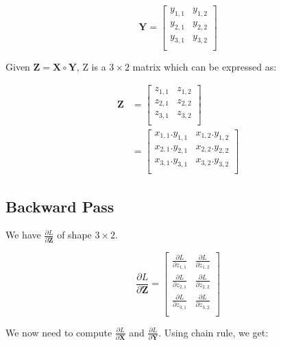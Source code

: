 \documentclass{article}
\newcommand{\matr}[1]{\mathbf{#1}} %
\begin{document}
\begin{displaymath}
\matr{Y} =
\begin{bmatrix}
y_{1,1} & y_{1,2} \\%
y_{2,1} & y_{2,2} \\%
y_{3,1} & y_{3,2} \\%
\end{bmatrix}
\end{displaymath}

Given $\matr{Z} = \matr{X} \circ \matr{Y}$, Z is a $3 \times 2$ matrix which can be expressed as:

\begin{align}
\matr{Z} &= \begin{bmatrix}
z_{1,1} & z_{1,2}\\[0.5em]
z_{2,1} & z_{2,2}\\[0.5em]
z_{3,1} & z_{3,2}\\[0.5em]
\end{bmatrix}
\\
&=
\begin{bmatrix}
x_{1,1}.y_{1,1} & x_{1,2}.y_{1,2} \\[0.5em]
x_{2,1}.y_{2,1} & x_{2,2}.y_{2,2} \\[0.5em]
x_{3,1}.y_{3,1} & x_{3,2}.y_{3,2} \\[0.5em]
\end{bmatrix}
\end{align}

\subsection{Backward Pass}
We have $\frac{\partial L}{\partial \matr{Z}}$ of shape $3 \times 2$.

\begin{displaymath}
\frac{\partial L}{\partial \matr{Z}} =
\begin{bmatrix}
\frac{\partial L}{\partial z_{1,1}} & \frac{\partial L}{\partial z_{1,2}} \\[0.5em]
\frac{\partial L}{\partial z_{2,1}} & \frac{\partial L}{\partial z_{2,2}} \\[0.5em]
\frac{\partial L}{\partial z_{3,1}} & \frac{\partial L}{\partial z_{3,2}} \\[0.5em]
\end{bmatrix}
\end{displaymath}

We now need to compute $\frac{\partial L}{\partial \matr{X}}$ and $\frac{\partial L}{\partial \matr{Y}}$. Using chain rule, we get:
\end{document}
